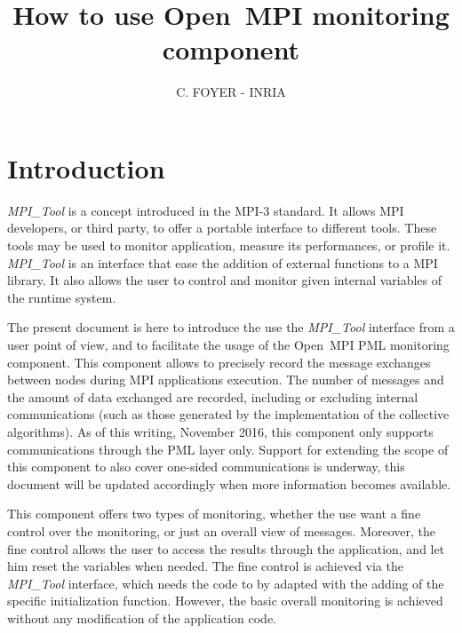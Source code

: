 \documentclass[notitlepage]{article}
\title{How to use Open~MPI monitoring component}
\author{C. FOYER - INRIA}
\newcommand{\mpit}[1]{\textit{MPI\_Tool#1}}
\begin{document}
\maketitle

\section{Introduction}

\mpit{} is a concept introduced in the MPI-3 standard. It allows MPI
developers, or third party, to offer a portable interface to
different tools. These tools may be used to monitor application,
measure its performances, or profile it. \mpit{} is an interface that
ease the addition of external functions to a MPI library. It also allows
the user to control and monitor given internal variables of the
runtime system.

The present document is here to introduce the use the \mpit{}
interface from a user point of view, and to facilitate the usage of the
Open~MPI PML monitoring component. This component allows to precisely record
the message exchanges between nodes during MPI applications
execution. The number of messages and the amount of data exchanged are
recorded, including or excluding internal communications (such as those
generated by the implementation of the collective algorithms). As of this
writing, November 2016, this component only supports communications through
the PML layer only. Support for extending the scope of this component to
also cover one-sided communications is underway, this document will be
updated accordingly when more information becomes available.

This component offers two types of monitoring, whether the use want a
fine control over the monitoring, or just an overall view of
messages. Moreover, the fine control allows the user to access the
results through the application, and let him reset the variables when
needed. The fine control is achieved via the \mpit{} interface, which
needs the code to by adapted with the adding of the specific
initialization function. However, the basic overall monitoring is
achieved without any modification of the application code.
\end{document}

